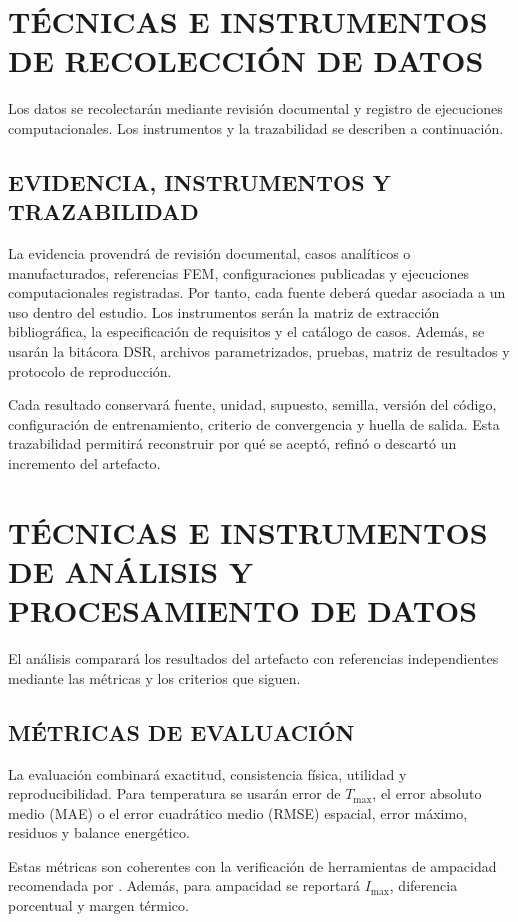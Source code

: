 \documentclass[11pt,a4paper,oneside]{report}
\newcommand{\Tmax}{T_{\max}}
\newcommand{\Imax}{I_{\max}}
\begin{document}
\section{TÉCNICAS E INSTRUMENTOS DE RECOLECCIÓN DE DATOS}

Los datos se recolectarán mediante revisión documental y registro de ejecuciones computacionales. Los instrumentos y la trazabilidad se describen a continuación.

\subsection{EVIDENCIA, INSTRUMENTOS Y TRAZABILIDAD}

La evidencia provendrá de revisión documental, casos analíticos o manufacturados, referencias FEM, configuraciones publicadas y ejecuciones computacionales registradas. Por tanto, cada fuente deberá quedar asociada a un uso dentro del estudio. Los instrumentos serán la matriz de extracción bibliográfica, la especificación de requisitos y el catálogo de casos. Además, se usarán la bitácora DSR, archivos parametrizados, pruebas, matriz de resultados y protocolo de reproducción.

Cada resultado conservará fuente, unidad, supuesto, semilla, versión del código, configuración de entrenamiento, criterio de convergencia y huella de salida. Esta trazabilidad permitirá reconstruir por qué se aceptó, refinó o descartó un incremento del artefacto.

\section{TÉCNICAS E INSTRUMENTOS DE ANÁLISIS Y PROCESAMIENTO DE DATOS}

El análisis comparará los resultados del artefacto con referencias independientes mediante las métricas y los criterios que siguen.

\subsection{MÉTRICAS DE EVALUACIÓN}

La evaluación combinará exactitud, consistencia física, utilidad y reproducibilidad. Para temperatura se usarán error de $\Tmax$, el error absoluto medio (MAE) o el error cuadrático medio (RMSE) espacial, error máximo, residuos y balance energético.

Estas métricas son coherentes con la verificación de herramientas de ampacidad recomendada por \textcite[93--99]{cigre2025}. Además, para ampacidad se reportará $\Imax$, diferencia porcentual y margen térmico.
\end{document}
